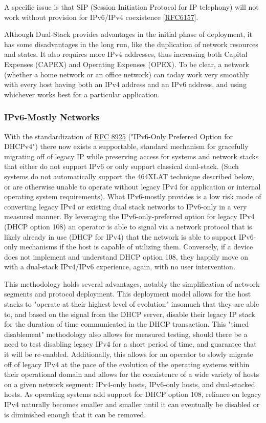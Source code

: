 \documentclass[
]{article}
\begin{document}
A specific issue is that SIP (Session Initiation Protocol for IP
telephony) will not work without provision for IPv6/IPv4 coexistence
{[}\href{https://www.rfc-editor.org/info/rfc6157}{RFC6157}{]}.

Although Dual-Stack provides advantages in the initial phase of
deployment, it has some disadvantages in the long run, like the
duplication of network resources and states. It also requires more IPv4
addresses, thus increasing both Capital Expenses (CAPEX) and Operating
Expenses (OPEX). To be clear, a network (whether a home network or an
office network) can today work very smoothly with every host having both
an IPv4 address and an IPv6 address, and using whichever works best for
a particular application.

\subsubsection{IPv6-Mostly Networks}\label{ipv6-mostly-networks}

With the standardization of
\href{https://www.rfc-editor.org/info/rfc8925}{RFC 8925} ("IPv6-Only
Preferred Option for DHCPv4") there now exists a supportable, standard
mechanism for gracefully migrating off of legacy IP while preserving
access for systems and network stacks that either do not support IPv6 or
only support classical dual-stack. (Such systems do not automatically
support the 464XLAT technique described below, or are otherwise unable
to operate without legacy IPv4 for application or internal operating
system requirements). What IPv6-mostly provides is a low risk mode of
converting legacy IPv4 or existing dual stack networks to IPv6-only in a
very measured manner. By leveraging the IPv6-only-preferred option for
legacy IPv4 (DHCP option 108) an operator is able to signal via a
network protocol that is likely already in use (DHCP for IPv4) that the
network is able to support IPv6-only mechanisms if the host is capable
of utilizing them. Conversely, if a device does not implement and
understand DHCP option 108, they happily move on with a dual-stack
IPv4/IPv6 experience, again, with no user intervention.

This methodology holds several advantages, notably the simplification of
network segments and protocol deployment. This deployment model allows
for the host stacks to "operate at their highest level of evolution"
insomuch that they are able to, and based on the signal from the DHCP
server, disable their legacy IP stack for the duration of time
communicated in the DHCP transaction. This "timed disablement"
methodology also allows for measured testing, should there be a need to
test disabling legacy IPv4 for a short period of time, and guarantee
that it will be re-enabled. Additionally, this allows for an operator to
slowly migrate off of legacy IPv4 at the pace of the evolution of the
operating systems within their operational domain and allows for the
coexistence of a wide variety of hosts on a given network segment:
IPv4-only hosts, IPv6-only hosts, and dual-stacked hosts. As operating
systems add support for DHCP option 108, reliance on legacy IPv4
naturally becomes smaller and smaller until it can eventually be
disabled or is diminished enough that it can be removed.
\end{document}
